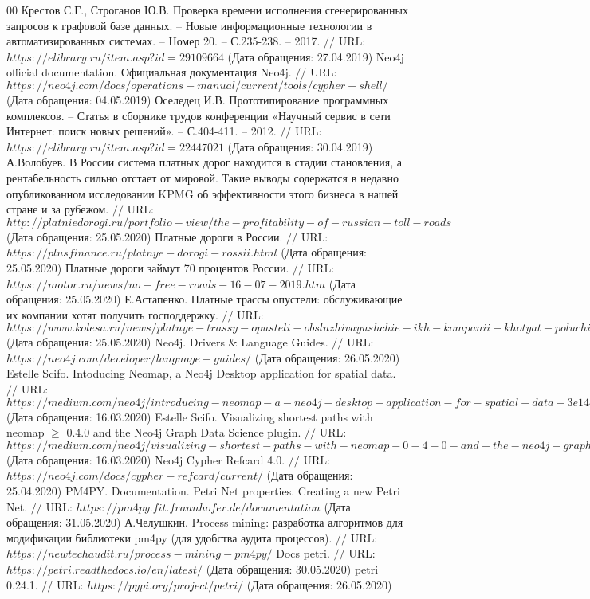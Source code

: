 \begin{thebibliography}{00}
	Крестов С.Г., Строганов Ю.В. Проверка времени исполнения сгенерированных запросов к графовой базе данных. – Новые информационные технологии в автоматизированных системах. -- Номер 20. -- С.235-238. -- 2017. $//$ URL: $https://elibrary.ru/item.asp?id=29109664$ (Дата обращения: 27.04.2019)
	Neo4j official documentation. Официальная документация Neo4j. $//$ URL: $https://neo4j.com/docs/operations-manual/current/tools/cypher-shell/$ (Дата обращения: 04.05.2019)
	Оселедец И.В. Прототипирование программных комплексов. -- Статья в сборнике трудов конференции «Научный сервис в сети Интернет: поиск новых решений». -- С.404-411. -- 2012. $//$ URL: $https://elibrary.ru/item.asp?id=22447021$ (Дата обращения: 30.04.2019)
	А.Волобуев. В России система платных дорог находится в стадии становления, а рентабельность сильно отстает от мировой. Такие выводы содержатся в недавно опубликованном исследовании KPMG об эффективности этого бизнеса в нашей стране и за рубежом. $//$ URL: $http://platniedorogi.ru/portfolio-view/the-profitability-of-russian-toll-roads$ (Дата обращения: 25.05.2020)
	Платные дороги в России. $//$ URL: $https://plusfinance.ru/platnye-dorogi-rossii.html$ (Дата обращения: 25.05.2020)
	Платные дороги займут 70 процентов России. $//$ URL: $https://motor.ru/news/no-free-roads-16-07-2019.htm$ (Дата обращения: 25.05.2020)
	Е.Астапенко. Платные трассы опустели: обслуживающие их компании хотят получить господдержку. $//$ URL: $https://www.kolesa.ru/news/platnye-trassy-opusteli-obsluzhivayushchie-ikh-kompanii-khotyat-poluchit-gospodderzhku$ (Дата обращения: 25.05.2020)
	Neo4j. Drivers \& Language Guides. $//$ URL: $https://neo4j.com/developer/language-guides/$ (Дата обращения: 26.05.2020)
	Estelle Scifo. Intoducing Neomap, a Neo4j Desktop application for spatial data. $//$ URL: $https://medium.com/neo4j/introducing-neomap-a-neo4j-desktop-application-for-spatial-data-3e14aad59db2$ (Дата обращения: 16.03.2020)
	Estelle Scifo. Visualizing shortest paths with neomap $\geq$ 0.4.0 and the Neo4j Graph Data Science plugin. $//$ URL: $https://medium.com/neo4j/visualizing-shortest-paths-with-neomap-0-4-0-and-the-neo4j-graph-data-science-plugin-18db92f680de$ (Дата обращения: 16.03.2020)
	Neo4j Cypher Refcard 4.0. $//$ URL: $https://neo4j.com/docs/cypher-refcard/current/$ (Дата обращения: 25.04.2020)
	PM4PY. Documentation. Petri Net properties. Creating a new Petri Net. $//$ URL: $https://pm4py.fit.fraunhofer.de/documentation$ (Дата обращения: 31.05.2020)
	А.Челушкин. Process mining: разработка алгоритмов для модификации библиотеки pm4py (для удобства аудита процессов). $//$ URL: $https://newtechaudit.ru/process-mining-pm4py/$
	Docs petri. $//$ URL: $https://petri.readthedocs.io/en/latest/$ (Дата обращения: 30.05.2020)
	petri 0.24.1. $//$ URL: $https://pypi.org/project/petri/$ (Дата обращения: 26.05.2020)
\end{thebibliography}
